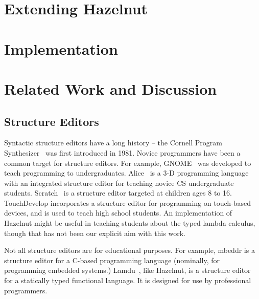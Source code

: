 \documentclass[preprint,9pt]{sigplanconf}
\begin{document}
% 


\section{Extending Hazelnut}\label{sec:extending}


\section{Implementation}
\label{sec:impl}


\section{Related Work and Discussion}\label{sec:rw}
\subsection{Structure Editors}
Syntactic structure editors have a long history -- the Cornell Program Synthesizer~\cite{teitelbaum_cornell_1981} was first introduced in 1981. Novice programmers have been a common target for structure editors. For example, 
GNOME~\cite{garlan_gnome:_1984} was developed to teach programming to undergraduates. 
Alice~\cite{Conway:2000:ALL:332040.332481} is a 3-D programming language with an integrated structure editor for teaching novice CS undergraduate students. Scratch~\cite{Resnick:2009:SP:1592761.1592779} is a structure editor targeted at children ages 8 to 16.  TouchDevelop \cite{tillmann_touchdevelop:_2011} incorporates a structure editor for programming on touch-based devices, and is used to teach high school students. An implementation of Hazelnut might be useful in teaching students about the typed lambda calculus, though that has not been our explicit aim with this work.

Not all structure editors are for educational purposes. For example,
mbeddr \cite{voelter_mbeddr:_2012} is a structure editor for a C-based programming language (nominally, for programming embedded systems.)  
Lamdu~\cite{lamdu}, like Hazelnut, is a structure editor for a statically typed functional language. It is designed for use by professional programmers. 
\end{document}
